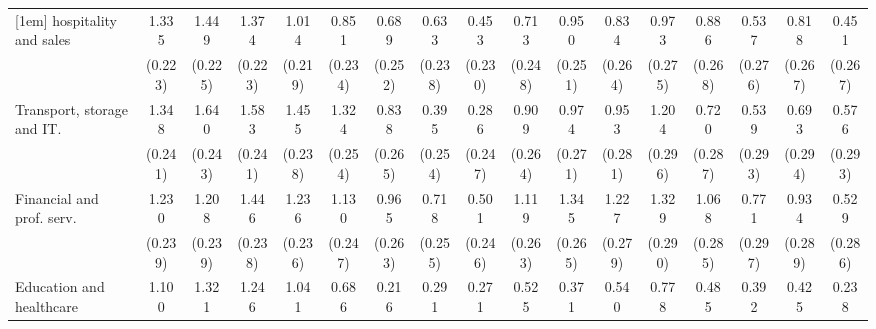 {\begin{tabular}{l*{16}{c}}
[1em]
hospitality and sales&       1.335\sym{***}&       1.449\sym{***}&       1.374\sym{***}&       1.014\sym{***}&       0.851\sym{***}&       0.689\sym{**} &       0.633\sym{**} &       0.453\sym{*}  &       0.713\sym{**} &       0.950\sym{***}&       0.834\sym{**} &       0.973\sym{***}&       0.886\sym{***}&       0.537         &       0.818\sym{**} &       0.451         \\
                    &     (0.223)         &     (0.225)         &     (0.223)         &     (0.219)         &     (0.234)         &     (0.252)         &     (0.238)         &     (0.230)         &     (0.248)         &     (0.251)         &     (0.264)         &     (0.275)         &     (0.268)         &     (0.276)         &     (0.267)         &     (0.267)         \\
[1em]
Transport, storage and IT.&       1.348\sym{***}&       1.640\sym{***}&       1.583\sym{***}&       1.455\sym{***}&       1.324\sym{***}&       0.838\sym{**} &       0.395         &       0.286         &       0.909\sym{***}&       0.974\sym{***}&       0.953\sym{***}&       1.204\sym{***}&       0.720\sym{*}  &       0.539         &       0.693\sym{*}  &       0.576\sym{*}  \\
                    &     (0.241)         &     (0.243)         &     (0.241)         &     (0.238)         &     (0.254)         &     (0.265)         &     (0.254)         &     (0.247)         &     (0.264)         &     (0.271)         &     (0.281)         &     (0.296)         &     (0.287)         &     (0.293)         &     (0.294)         &     (0.293)         \\
[1em]
Financial and prof. serv.&       1.230\sym{***}&       1.208\sym{***}&       1.446\sym{***}&       1.236\sym{***}&       1.130\sym{***}&       0.965\sym{***}&       0.718\sym{**} &       0.501\sym{*}  &       1.119\sym{***}&       1.345\sym{***}&       1.227\sym{***}&       1.329\sym{***}&       1.068\sym{***}&       0.771\sym{**} &       0.934\sym{**} &       0.529         \\
                    &     (0.239)         &     (0.239)         &     (0.238)         &     (0.236)         &     (0.247)         &     (0.263)         &     (0.255)         &     (0.246)         &     (0.263)         &     (0.265)         &     (0.279)         &     (0.290)         &     (0.285)         &     (0.297)         &     (0.289)         &     (0.286)         \\
[1em]
Education and healthcare&       1.100\sym{***}&       1.321\sym{***}&       1.246\sym{***}&       1.041\sym{***}&       0.686\sym{*}  &       0.216         &       0.291         &       0.271         &       0.525         &       0.371         &       0.540         &       0.778\sym{*}  &       0.485         &       0.392         &       0.425         &       0.238         \\

\end{tabular}}

